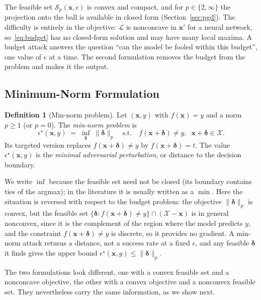 \documentclass[10pt,a4paper]{extarticle}
\theoremstyle{definition}
\newtheorem{definition}{Definition}[section]
\newcommand{\X}{\mathcal{X}}
\newcommand{\Loss}{\mathcal{L}}
\newcommand{\x}{\mathbf{x}}
\newcommand{\xadv}{\mathbf{x}'}
\newcommand{\bdelta}{\boldsymbol{\delta}}
\begin{document}
The feasible set \(\mathcal{S}_p(\x,\epsilon)\) is convex and compact, and for \(p\in\{2,\infty\}\) the projection onto the ball is available in closed form (Section~\ref{sec:pgd}). The difficulty is entirely in the objective: \(\Loss\) is nonconcave in \(\xadv\) for a neural network, so~\eqref{eq:budget} has no closed-form solution and may have many local maxima. A budget attack answers the question \enquote{can the model be fooled within this budget}, one value of \(\epsilon\) at a time. The second formulation removes the budget from the problem and makes it the output.

\subsection{Minimum-Norm Formulation}\label{sec:minnormform}

\begin{definition}[Min-norm problem]\label{def:minnorm}
Let \((\x,y)\) with \(f(\x)=y\) and a norm \(p\ge1\) (or \(p=0\)). The \emph{min-norm problem} is
\begin{equation}\label{eq:minnorm}
\epsilon^\star(\x,y)\;=\;\inf_{\bdelta}\;\|\bdelta\|_p
\quad\text{s.t.}\quad f(\x+\bdelta)\neq y,\;\; \x+\bdelta\in\X .
\end{equation}
Its targeted version replaces \(f(\x+\bdelta)\neq y\) by \(f(\x+\bdelta)=t\). The value \(\epsilon^\star(\x,y)\) is the \emph{minimal adversarial perturbation}, or distance to the decision boundary.
\end{definition}

We write \(\inf\) because the feasible set need not be closed (its boundary contains ties of the argmax); in the literature it is usually written as a \(\min\). Here the situation is reversed with respect to the budget problem: the objective \(\|\bdelta\|_p\) is convex, but the feasible set \(\{\bdelta: f(\x+\bdelta)\neq y\}\cap(\X-\x)\) is in general nonconvex, since it is the complement of the region where the model predicts \(y\), and the constraint \(f(\x+\bdelta)\neq y\) is discrete, so it provides no gradient. A min-norm attack returns a distance, not a success rate at a fixed \(\epsilon\), and any feasible \(\bdelta\) it finds gives the upper bound \(\epsilon^\star(\x,y)\le\|\bdelta\|_p\).

The two formulations look different, one with a convex feasible set and a nonconcave objective, the other with a convex objective and a nonconvex feasible set. They nevertheless carry the same information, as we show next.
\end{document}
